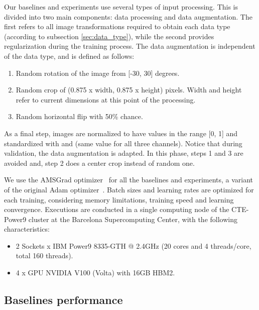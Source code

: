 \documentclass{article}
\begin{document}
Our baselines and experiments use several types of input processing. This is divided into two main components: data processing and data augmentation. The first refers to all image transformations required to obtain each data type (according to subsection \ref{sec:data_type}), while the second provides regularization during the training process. The data augmentation is independent of the data type, and is defined as follows:
\begin{enumerate}
    \item Random rotation of the image from [-30, 30] degrees.
    \item Random crop of (0.875 x width, 0.875 x height) pixels. Width and height refer to current dimensions at this point of the processing.
    \item Random horizontal flip with 50\% chance.
\end{enumerate}

As a final step, images are normalized to have values in the range [0, 1] and standardized with  and  (same value for all three channels). Notice that during validation, the data augmentation is adapted. In this phase, steps 1 and 3 are avoided and, step 2 does a center crop instead of random one.

We use the AMSGrad optimizer~\citep{reddi2019convergence} for all the baselines and experiments, a variant of the original Adam optimizer~\citep{kingma2014adam}. Batch sizes and learning rates are optimized for each training, considering memory limitations, training speed and learning convergence. Executions are conducted in a single computing node of the CTE-Power9 cluster at the Barcelona Supercomputing Center, with the following characteristics:
\begin{itemize}
    \item 2 Sockets x IBM Power9 8335-GTH @ 2.4GHz (20 cores and 4 threads/core, total 160 threads).
    \item 4 x GPU NVIDIA V100 (Volta) with 16GB HBM2.
\end{itemize}

\subsection{Baselines performance} \label{sec:baselines_perf}
\end{document}
